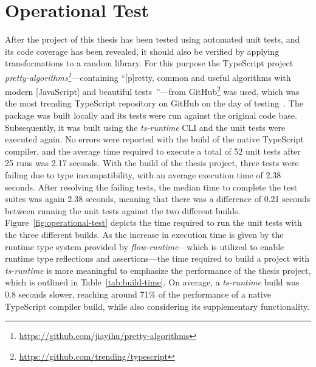 \section{Operational Test}
\label{sec:operational-test}

After the project of this thesis has been tested using automated unit tests, and its code coverage has been revealed, it should also be verified by applying transformations to a random library. For this purpose the TypeScript project \emph{pretty-algorithms\footnote{\url{https://github.com/jiayihu/pretty-algorithms}}}---containing ``[p]retty, common and useful algorithms with modern [JavaScript] and beautiful tests~\cite{Evaluation:pretty-algorithms}''---from GitHub\footnote{\url{https://github.com/trending/typescript}} was used, which was the most trending TypeScript repository on GitHub on the day of testing~\cite{GitHub:Trending:Archive}. The package was built locally and its tests were run against the original code base. Subsequently, it was built using the \emph{ts-runtime} CLI and the unit tests were executed again. No errors were reported with the build of the native TypeScript compiler, and the average time required to execute a total of 52 unit tests after 25 runs was 2.17 seconds. With the build of the thesis project, three tests were failing due to type incompatibility, with an average execution time of 2.38 seconds. After resolving the failing tests, the median time to complete the test suites was again 2.38 seconds, meaning that there was a difference of 0.21 seconds between running the unit tests against the two different builds. Figure~\ref{fig:operational-test} depicts the time required to run the unit tests with the three different builds. As the increase in execution time is given by the runtime type system provided by \emph{flow-runtime}---which is utilized to enable runtime type reflections and assertions---the time required to build a project with \emph{ts-runtime} is more meaningful to emphasize the performance of the thesis project, which is outlined in Table~\ref{tab:build-time}. On average, a \emph{ts-runtime} build was 0.8 seconds slower, reaching around 71\% of the performance of a native TypeScript compiler build, while also considering its supplementary functionality. 
